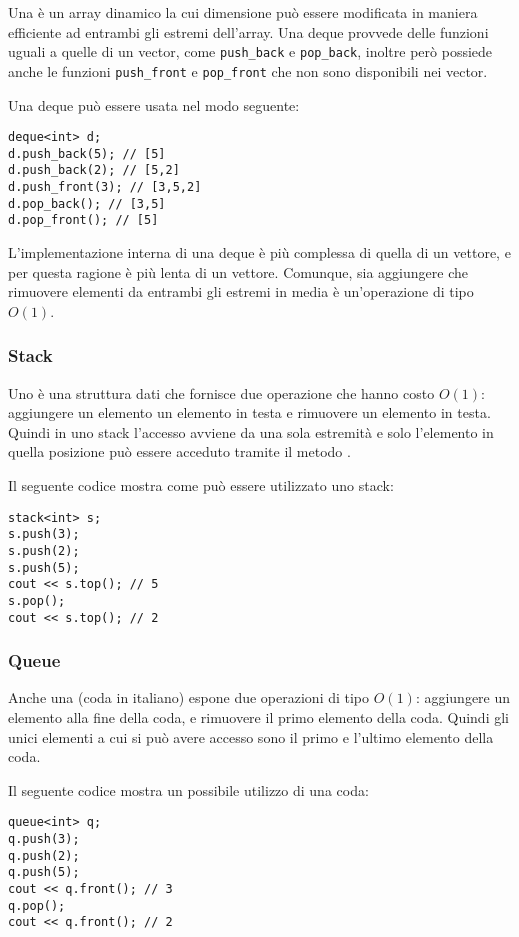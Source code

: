 
Una  è un array dinamico
la cui dimensione può essere modificata in 
maniera efficiente ad entrambi gli estremi dell'array.
Una deque provvede delle funzioni uguali a quelle di un vector,
come \texttt{push\_back} e \texttt{pop\_back}, 
inoltre però possiede anche le funzioni
\texttt{push\_front} e \texttt{pop\_front}
che non sono disponibili nei vector.

Una deque può essere usata nel modo seguente:
\begin{lstlisting}
deque<int> d;
d.push_back(5); // [5]
d.push_back(2); // [5,2]
d.push_front(3); // [3,5,2]
d.pop_back(); // [3,5]
d.pop_front(); // [5]
\end{lstlisting}

L'implementazione interna di una deque è più 
complessa di quella di un vettore,
e per questa ragione è più lenta di un vettore.
Comunque, sia aggiungere che rimuovere elementi 
da entrambi gli estremi in media è un'operazione di tipo $O(1)$.

\subsubsection{Stack}


Uno  è una struttura dati che fornisce 
due operazione che hanno costo $O(1)$:
aggiungere un elemento un elemento in testa
e rimuovere un elemento in testa.
Quindi in uno stack l'accesso avviene da una sola
estremità e solo l'elemento in quella posizione può essere 
acceduto tramite il metodo .

Il seguente codice mostra come può essere utilizzato uno stack:
\begin{lstlisting}
stack<int> s;
s.push(3);
s.push(2);
s.push(5);
cout << s.top(); // 5
s.pop();
cout << s.top(); // 2
\end{lstlisting}
\subsubsection{Queue}


Anche una  (coda in italiano) 
espone due operazioni di tipo $O(1)$:
aggiungere un elemento alla fine della coda,
e rimuovere il primo elemento della coda.
Quindi gli unici elementi a cui si può avere 
accesso sono il primo e l'ultimo elemento 
della coda.

Il seguente codice mostra un possibile utilizzo di una coda:
\begin{lstlisting}
queue<int> q;
q.push(3);
q.push(2);
q.push(5);
cout << q.front(); // 3
q.pop();
cout << q.front(); // 2
\end{lstlisting}


